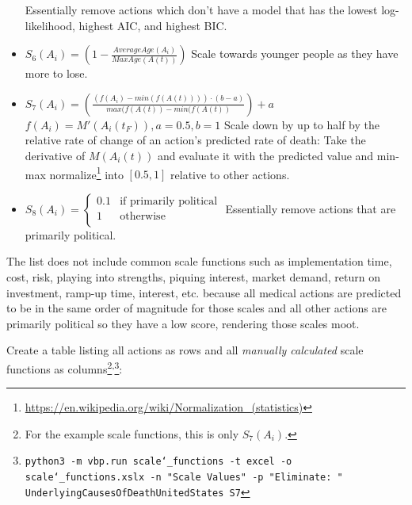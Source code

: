 \documentclass[12pt, a4paper, twocolumn]{article}
\begin{document}
\begin{itemize}
                \newline\newline
                Essentially remove actions which don't have a model that has the lowest log-likelihood, highest AIC, and highest BIC.
\item $S_6(A_i) = \left(1 - \frac{AverageAge(A_i)}{MaxAge(A(t))}\right)$
                \newline\newline
                Scale towards younger people as they have more to lose.
\item $S_7(A_i) = \left(\frac{(f(A_i)-min(f(A(t)))) \cdot (b-a)}{max(f(A(t))-min(f(A(t))}\right) + a$
                \newline\newline
                $f(A_i) = M'(A_i(t_F)), a=0.5, b=1$
                \newline\newline
                Scale down by up to half by the relative rate of change of an action's predicted rate of death: Take the derivative of $M(A_i(t))$ and evaluate it with the predicted value and min-max normalize\footnote{\url{https://en.wikipedia.org/wiki/Normalization_(statistics)}} into $[0.5,1]$ relative to other actions.
\item $S_8(A_i) = \begin{cases}\text{0.1} & \mbox{if primarily political} \\ \text{1} & \mbox{otherwise} \\ \end{cases}$
                \newline\newline
                Essentially remove actions that are primarily political.
\end{itemize}

The list does not include common scale functions such as implementation time, cost, risk, playing into strengths, piquing interest, market demand, return on investment, ramp-up time, interest, etc. because all medical actions are predicted to be in the same order of magnitude for those scales and all other actions are primarily political so they have a low score, rendering those scales moot.

Create a table listing all actions as rows and all \textit{manually calculated} scale functions as columns\footnote{For the example scale functions, this is only $S_7(A_i)$.}\textsuperscript{,}\footnote{\texttt{python3 -m vbp.run scale\char`_functions -t excel -o scale\char`_functions.xslx -n "Scale Values" -p "Eliminate: " UnderlyingCausesOfDeathUnitedStates S7}}:
\end{document}
